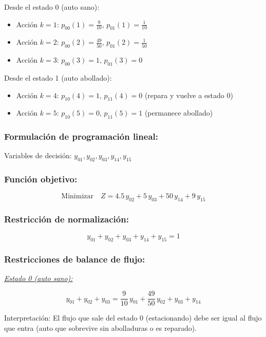 \documentclass[a4paper,11pt]{article}
\begin{document}
Desde el estado 0 (auto sano):
\begin{itemize}
    \item Acción $k=1$: $p_{00}(1) = \frac{9}{10}$, $p_{01}(1) = \frac{1}{10}$
    \item Acción $k=2$: $p_{00}(2) = \frac{49}{50}$, $p_{01}(2) = \frac{1}{50}$
    \item Acción $k=3$: $p_{00}(3) = 1$, $p_{01}(3) = 0$
\end{itemize}

Desde el estado 1 (auto abollado):
\begin{itemize}
    \item Acción $k=4$: $p_{10}(4) = 1$, $p_{11}(4) = 0$ (repara y vuelve a estado 0)
    \item Acción $k=5$: $p_{10}(5) = 0$, $p_{11}(5) = 1$ (permanece abollado)
\end{itemize}

\subsubsection{Formulación de programación lineal:}

Variables de decisión: $y_{01}, y_{02}, y_{03}, y_{14}, y_{15}$

\subsubsection{Función objetivo:}

\[
\text{Minimizar} \quad Z = 4.5\,y_{02} + 5\,y_{03} + 50\,y_{14} + 9\,y_{15}
\]

\subsubsection{Restricción de normalización:}

\[
y_{01} + y_{02} + y_{03} + y_{14} + y_{15} = 1
\]

\subsubsection{Restricciones de balance de flujo:}

\textit{\underline{Estado 0 (auto sano):}}

\[
y_{01} + y_{02} + y_{03} = \frac{9}{10}\,y_{01} + \frac{49}{50}\,y_{02} + y_{03} + y_{14}
\]

Interpretación: El flujo que sale del estado 0 (estacionando) debe ser igual al flujo que entra (auto que sobrevive sin abolladuras o es reparado).
\end{document}
